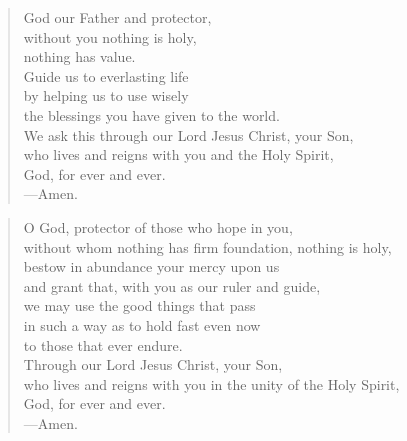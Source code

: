 \prayer

\setlength{\leftmargini}{\prayerleftmargini}

\begin{verse}
God our Father and protector,\\
without you nothing is holy,\\
nothing has value.\\
Guide us to everlasting life\\
by helping us to use wisely\\
the blessings you have given to the world.\\
We ask this through our Lord Jesus Christ, your Son,\\
who lives and reigns with you and the Holy Spirit,\\
God, for ever and ever.\\
{\color{red}---\thinspace}Amen.
\end{verse}


\begin{verse}
O God, protector of those who hope in you,\\
without whom nothing has firm foundation, nothing is holy,\\
bestow in abundance your mercy upon us\\
and grant that, with you as our ruler and guide,\\
we may use the good things that pass\\
in such a way as to hold fast even now\\
to those that ever endure.\\
Through our Lord Jesus Christ, your Son,\\
who lives and reigns with you in the unity of the Holy Spirit,\\
God, for ever and ever.\\
{\color{red}---\thinspace}Amen.
\end{verse}

\setlength{\leftmargini}{\defleftmargini}

